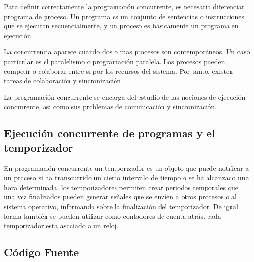 \documentclass{article}
\begin{document}
	Para definir correctamente la programación concurrente, es necesario diferenciar programa de proceso.
	Un programa es un conjunto de sentencias o instrucciones que se ejecutan secuencialmente, y un proceso es básicamente un programa en ejecución.
	
	La concurrencia aparece cuando dos o mas procesos son contemporáneos. Un caso particular es el paralelismo o programación paralela. Los procesos pueden competir o colaborar entre si por los recursos del sistema. Por tanto, existen tareas de colaboración y sincronización
	
	La programación concurrente se encarga del estudio de las nociones de ejecución concurrente, asi como sus problemas de comunicación y sincronización.

\vspace{1cm}
\begin{centering} \section{Ejecución concurrente de programas y el temporizador} \end{centering}
	En programación concurrente un temporizador es un objeto que puede notificar a un proceso si ha transcurrido un cierto intervalo de tiempo o se ha alcanzado una hora determinada, los temporizadores permiten crear periodos temporales que una vez finalizados pueden generar señales que se envíen a otros procesos o al sistema operativo, informando sobre la finalización del temporizador. De igual forma también se pueden utilizar como contadores de cuenta atrás. cada temporizador esta asociado a un reloj.


\newpage
\begin{centering} \section{Código Fuente} \end{centering}
\end{document}
